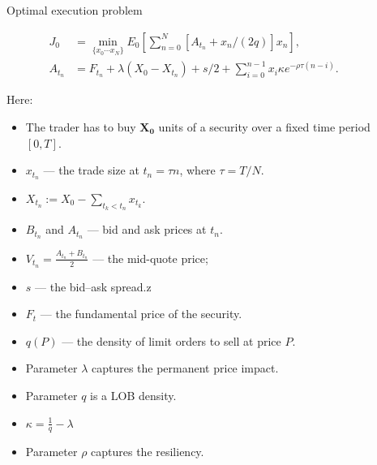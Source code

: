 \documentclass[]{beamer}
\begin{document}
\begin{frame}[t]
\begin{columns}[t]
\begin{column}{\onecolwid}
\begin{block}{Optimal execution problem}
        
        \begin{align*} \label{oEproblem}
           J_0 &= \min _{\{x_0 \cdots x_N \}} E_0 \left[ \sum _{n=0}^N [A_{t_n} + x_n /(2q)] x_n\right],  \\
           A_{t_n} &= F_{t_n} + \lambda (X_0 - X_{t_n}) + s/2 + \sum _{i=0}^{n-1} x_i \kappa e^{- \rho \tau (n - i)}.
        \end{align*}
        
       Here:
       \begin{itemize}
        \item The trader has to buy $\mathbf{X_0}$ units of a security over a ﬁxed time period $[0,T]$. 
        \item $x_{t_n}$ 
        --- the trade size at $t_n = \tau n$, where $\tau = T / N$. 
        \item $X_{t_n} := X_0 - \sum _{t_k < t_n} x_{t_k}$. 
        \item $B_{t_n}$ and $A_{t_n}$ --- bid and ask prices at $t_n$. 
        \item $V_{t_n} = \frac{A_{t_n} + B_{t_n}}{2}$ 
        --- the mid-quote price; 
        \item $s$ --- the bid–ask spread.z
        \item $F_t$ --- the fundamental price of the security.
        \item $q(P)$ --- the density of limit orders to sell at price $P$.
        \item Parameter $\lambda$ captures the permanent price impact.
        \item Parameter $q$ is a LOB density. 
         \item $\kappa = \frac{1}{q} - \lambda $
        \item Parameter $\rho$ captures the resiliency.

       \end{itemize}
        \end{block}

    
    
    \end{column} 
    \begin{column}{\sepwid}\end{column} %
    
    \begin{column}{\onecolwid} %


\end{column}
\end{columns}
\end{frame}
\end{document}
